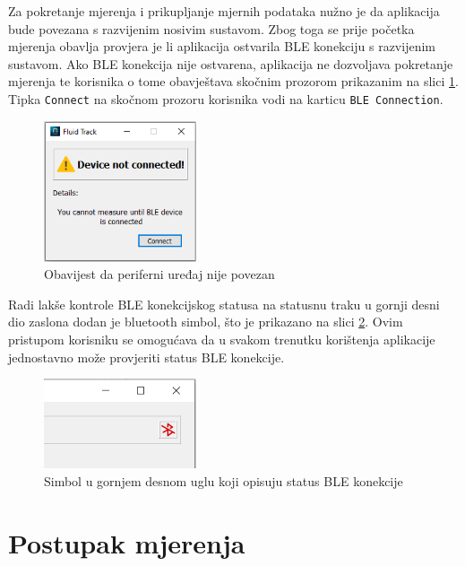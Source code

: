 \documentclass[../diplomski_rad.tex]{subfiles}
\begin{document}
Za pokretanje mjerenja i prikupljanje mjernih podataka nužno je da aplikacija bude povezana s razvijenim nosivim sustavom. 
Zbog toga se prije početka mjerenja obavlja provjera je li aplikacija ostvarila BLE konekciju s razvijenim sustavom. 
Ako BLE konekcija nije ostvarena, aplikacija ne dozvoljava pokretanje mjerenja te korisnika o tome obavještava 
skočnim prozorom prikazanim na slici \ref{slk:ble_not_connected}. Tipka \texttt{Connect} na skočnom prozoru korisnika 
vodi na karticu \texttt{BLE Connection}.

\begin{figure}[htb]
    \centering
    \includegraphics[width=0.4\textwidth]{Figures/ble_not_connected.png} 
    \caption{Obavijest da periferni uređaj nije povezan}
    \label{slk:ble_not_connected}
\end{figure}

Radi lakše kontrole BLE konekcijskog statusa na statusnu traku u gornji desni dio zaslona dodan je bluetooth simbol, 
što je prikazano na slici \ref{slk:ble_status}.  
Ovim pristupom korisniku se omogućava da u svakom trenutku korištenja aplikacije jednostavno može provjeriti status BLE konekcije. 

\begin{figure}[htb]
    \centering
    \includegraphics[width=0.4\textwidth]{Figures/cosak.png} 
    \caption{Simbol u gornjem desnom uglu koji opisuju status BLE konekcije}
    \label{slk:ble_status}
\end{figure}

\section{Postupak mjerenja}
\end{document}

